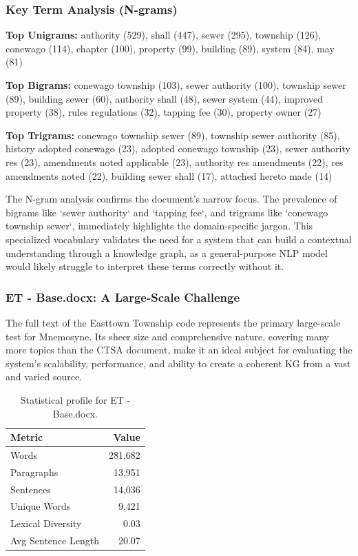 \subsubsection*{Key Term Analysis (N-grams)}
\textbf{Top Unigrams:} 
authority (529), shall (447), sewer (295), township (126), conewago (114), chapter (100), property (99), building (89), system (84), may (81)
\par
\textbf{Top Bigrams:} 
conewago township (103), sewer authority (100), township sewer (89), building sewer (60), authority shall (48), sewer system (44), improved property (38), rules regulations (32), tapping fee (30), property owner (27)
\par
\textbf{Top Trigrams:} 
conewago township sewer (89), township sewer authority (85), history adopted conewago (23), adopted conewago township (23), sewer authority res (23), amendments noted applicable (23), authority res amendments (22), res amendments noted (22), building sewer shall (17), attached hereto made (14)
\par
\vspace{1em}
The N-gram analysis confirms the document's narrow focus. The prevalence of bigrams like `sewer authority` and `tapping fee`, and trigrams like `conewago township sewer`, immediately highlights the domain-specific jargon. This specialized vocabulary validates the need for a system that can build a contextual understanding through a knowledge graph, as a general-purpose NLP model would likely struggle to interpret these terms correctly without it.

\subsubsection*{ET - Base.docx: A Large-Scale Challenge}
The full text of the Easttown Township code represents the primary large-scale test for Mnemosyne. Its sheer size and comprehensive nature, covering many more topics than the CTSA document, make it an ideal subject for evaluating the system's scalability, performance, and ability to create a coherent KG from a vast and varied source.

\begin{table}[!ht]
\centering
\begin{tabular}{lr}
\toprule
\textbf{Metric} & \textbf{Value} \\
\midrule
Words & 281,682 \\
Paragraphs & 13,951 \\
Sentences & 14,036 \\
Unique Words & 9,421 \\
Lexical Diversity & 0.03 \\
Avg Sentence Length & 20.07 \\
\bottomrule
\end{tabular}
\caption{Statistical profile for ET - Base.docx.}
\label{tab:et_stats}
\end{table}

